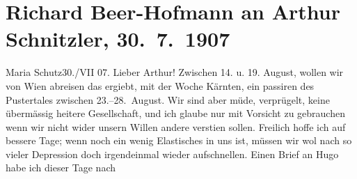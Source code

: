 

         
         \renewcommand{\erwaehntePersonen}{Personen: Richard Beer-Hofmann, Hugo von Hofmannsthal, Olga Schnitzler}
         \renewcommand{\erwaehnteOrte}{Orte: Kärnten, Maria Schutz, Pustertal, Welsberg-Taisten, Wien, Wildbad Waldbrunn}
         \renewcommand{\erwaehnteWerke}{}
               \section[Richard Beer-Hofmann an Arthur Schnitzler, 30. 7. 1907]{ Richard Beer-Hofmann an Arthur Schnitzler, 30. 7. 1907}\nopagebreak{}\rehead{ }\begin{ledgroupsized}[t]{13cm}\normalsize\beginnumbering{} \toendnotes[C]{\smallbreak\pagebreak[2]} 
\toendnotes[C]{\smallbreak}\pstart
           \raggedleft{}{\pb}Maria Schutz30./VII 07.\pend
           \pstart
           Lieber Arthur! Zwischen 14. u. 19. August,
               wollen wir von Wien abreisen das ergiebt, mit der
               Woche Kärnten, ein passiren des Pustertales zwischen 23.–28. August.\pend
           \pstart
           Wir sind aber müde, verprügelt, keine übermässig heitere Gesellschaft, und ich glaube
               nur mit Vorsicht zu gebrauchen wenn wir nicht wider unsern Willen andere versti{\geminationm}en sollen.\pend
           \pstart
           {\pb}Freilich hoffe ich auf bessere
               Tage; wenn noch ein wenig Elastisches in uns ist, müssen wir wol nach so vieler
               Depression doch irgendeinmal wieder aufschnellen.\pend
           \pstart
           Einen Brief an Hugo habe ich dieser Tage nach

\end{ledgroupsized}
